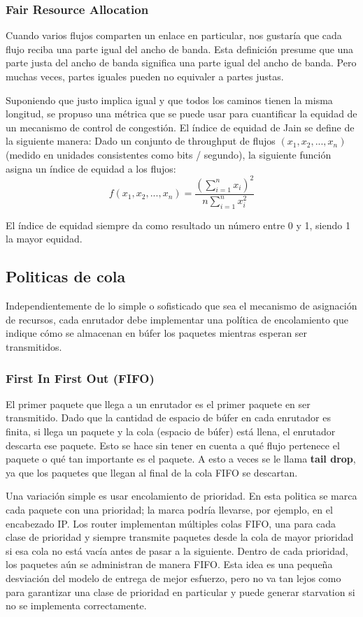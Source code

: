 \subsubsection*{Fair Resource Allocation}
Cuando varios flujos comparten un enlace en particular, nos gustaría que cada flujo reciba una parte igual del ancho de banda. Esta definición presume que una parte justa del ancho de banda significa una parte igual del ancho de banda. Pero muchas veces, partes iguales pueden no equivaler a partes justas.

Suponiendo que justo implica igual y que todos los caminos tienen la misma longitud, se propuso una métrica que se puede usar para cuantificar la equidad de un mecanismo de control de congestión. El índice de equidad de Jain se define de la siguiente manera: Dado un conjunto de throughput de flujos \((x_1, x_2, ..., x_n)\) (medido en unidades consistentes como bits / segundo), la siguiente función asigna un índice de equidad a los flujos:
\[
  f(x_1, x_2, ..., x_n) = \frac{(\sum_{i=1}^{n} x_i)^2}{n \sum_{i=1}^{n} x_i^2}
\]

El índice de equidad siempre da como resultado un número entre 0 y 1, siendo 1 la mayor equidad.

\subsection{Politicas de cola}
Independientemente de lo simple o sofisticado que sea el mecanismo de asignación de recursos, cada enrutador debe implementar una política de encolamiento que indique cómo se almacenan en búfer los paquetes mientras esperan ser transmitidos.

\subsubsection{First In First Out (FIFO)}
El primer paquete que llega a un enrutador es el primer paquete en ser transmitido. Dado que la cantidad de espacio de búfer en cada enrutador es finita, si llega un paquete y la cola (espacio de búfer) está llena, el enrutador descarta ese paquete. Esto se hace sin tener en cuenta a qué flujo pertenece el paquete o qué tan importante es el paquete. A esto a veces se le llama \textbf{tail drop}, ya que los paquetes que llegan al final de la cola FIFO se descartan.

Una variación simple es usar encolamiento de prioridad. En esta politica se marca cada paquete con una prioridad; la marca podría llevarse, por ejemplo, en el encabezado IP. Los router implementan múltiples colas FIFO, una para cada clase de prioridad y siempre transmite paquetes desde la cola de mayor prioridad si esa cola no está vacía antes de pasar a la siguiente. Dentro de cada prioridad, los paquetes aún se administran de manera FIFO. Esta idea es una pequeña desviación del modelo de entrega de mejor esfuerzo, pero no va tan lejos como para garantizar una clase de prioridad en particular y puede generar starvation si no se implementa correctamente.

